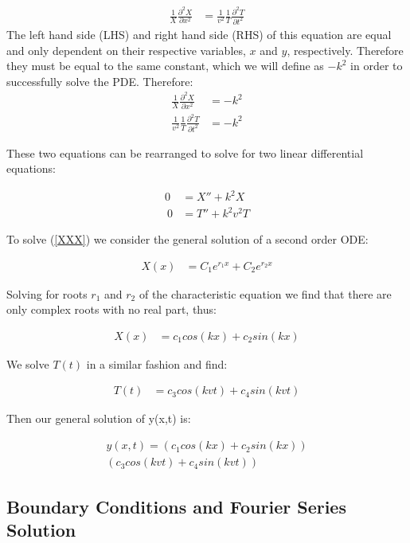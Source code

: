 \documentclass[%
 reprint,
 amsmath,amssymb,
 aps,
]{revtex4-1}
\begin{document}
\begin{align}
\frac{1}{X} \frac{\partial^2 X}{\partial x^2} &=  \frac{1}{v^2} \frac{1}{T}\frac{\partial^2T}{\partial t^2}   
\end{align}
The left hand side (LHS) and right hand side (RHS) of this equation are equal and only dependent on their respective variables, $x$ and $y$, respectively. Therefore they must be equal to the same constant, which we will define as $-k^2$ in order to successfully solve the PDE. Therefore:
\begin{align}
\frac{1}{X} \frac{\partial^2 X}{\partial x^2} &= -k^2 \\
\frac{1}{v^2} \frac{1}{T}\frac{\partial^2T}{\partial t^2}  &= -k^2
\end{align}

These two equations can be rearranged to solve for two linear differential equations:

\begin{align}
0 &= X'' + k^2 X \label{XXX}\\\
0 &= T'' + k^2v^2 T \label{YYY}
\end{align}

To solve (\ref{XXX}) we consider the general solution of a second order ODE:

\begin{align}
X(x) &= C_1e^{r_1 x} + C_2e^{r_2 x}
\end{align}

Solving for roots $r_1$ and $r_2$ of the characteristic equation we find that there are only complex roots with no real part, thus:

\begin{align}
X(x) &= c_1 cos(kx) + c_2sin(kx)
\end{align}

We solve $T(t)$ in a similar fashion and find:

\begin{align}
T(t) &= c_3 cos(kvt) + c_4sin(kvt)
\end{align}

Then our general solution of y(x,t) is:

\begin{multline}
y(x,t) =(c_1 cos(kx) + c_2sin(kx))\\(c_3 cos(kvt) + c_4sin(kvt))
\end{multline}

\subsection{\label{sec:level1}Boundary Conditions and Fourier Series Solution}
\end{document}
